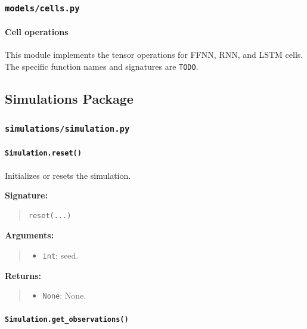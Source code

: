 \documentclass[11pt]{article}
\begin{document}
\subsubsection{\texttt{models/cells.py}}

\paragraph{Cell operations}

This module implements the tensor operations for FFNN, RNN, and LSTM
cells. The specific function names and signatures are \texttt{TODO}.

\subsection{Simulations Package}

\subsubsection{\texttt{simulations/simulation.py}}

\paragraph{\texttt{Simulation.reset()}}

Initializes or resets the simulation.

\textbf{Signature:}
\begin{quote}
\begin{verbatim}
reset(...)
\end{verbatim}
\end{quote}

\textbf{Arguments:}
\begin{quote}
\begin{itemize}
    \item \texttt{int}: seed.
\end{itemize}
\end{quote}

\textbf{Returns:}
\begin{quote}
\begin{itemize}
    \item \texttt{None}: None.
\end{itemize}
\end{quote}

\paragraph{\texttt{Simulation.get\_observations()}}
\end{document}
